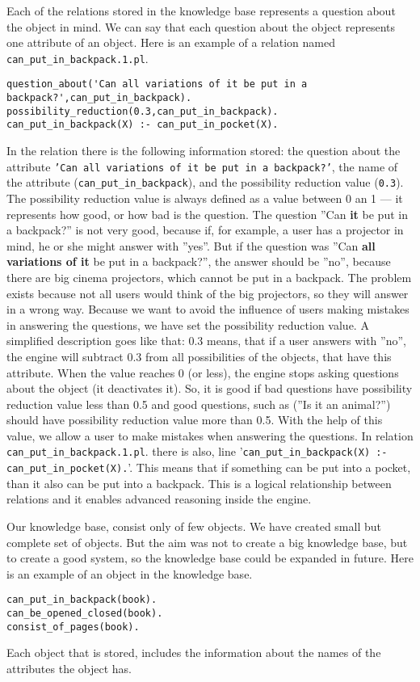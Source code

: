 \documentclass[a4paper]{article}
\begin{document}
Each of the relations stored in the knowledge base represents a question about the object in mind. We can say that each question about the object represents one attribute of an object. Here is an example of a relation named \verb|can_put_in_backpack.1.pl|.
\begin{lstlisting}[caption=Relation can\_put\_in\_backpack.1.pl,label=lst:relationexample]
question_about('Can all variations of it be put in a backpack?',can_put_in_backpack).
possibility_reduction(0.3,can_put_in_backpack).
can_put_in_backpack(X) :- can_put_in_pocket(X).
\end{lstlisting}
In the relation there is the following information stored: the question about the attribute \texttt{'Can all variations of it be put in a backpack?'}, the name of the attribute (\texttt{can\_put\_in\_backpack}), and the possibility reduction value (\verb|0.3|). The possibility reduction value is always defined as a value between 0 an 1 --- it represents how good, or how bad is the question. The question ''Can \textbf{it} be put in a backpack?'' is not very good, because if, for example, a user has a projector in mind, he or she might answer with ''yes''. But if the question was ''Can \textbf{all variations of it} be put in a backpack?'', the answer should be ''no'', because there are big cinema projectors, which cannot be put in a backpack. The problem exists because not all users would think of the big projectors, so they will answer in a wrong way. Because we want to avoid the influence of users making mistakes in answering the questions, we have set the possibility reduction value. A simplified description goes like that: 0.3 means, that if a user answers with ''no'', the engine will subtract 0.3 from all possibilities of the objects, that have this attribute. When the value reaches 0 (or less), the engine stops asking questions about the object (it deactivates it). So, it is good if bad questions have possibility reduction value less than 0.5 and good questions, such as (''Is it an animal?'') should have possibility reduction value more than 0.5. With the help of this value, we allow a user to make mistakes when answering the questions.
In relation \verb|can_put_in_backpack.1.pl|. there is also, line '\verb|can_put_in_backpack(X) :- can_put_in_pocket(X).|'. This means that if something can be put into a pocket, than it also can be put into a backpack. This is a logical relationship between relations and it enables advanced reasoning inside the engine. 

Our knowledge base, consist only of few objects. We have created small but complete set of objects. But the aim was not to create a big knowledge base, but to create a good system, so the knowledge base could be expanded in future. Here is an example of an object in the knowledge base.
\begin{lstlisting}[caption=Object book.pl,label=lst:objectexample]
can_put_in_backpack(book).
can_be_opened_closed(book).
consist_of_pages(book).
\end{lstlisting}
Each object that is stored, includes the information about the names of the attributes the object has.
\end{document}
